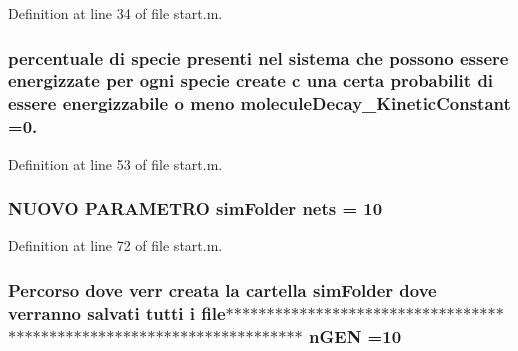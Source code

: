 Definition at line 34 of file start.\-m.

\hypertarget{a00065_a85569bbcfd8fbc0081b5a144eaf516f5}{
\subsubsection[{molecule\-Decay\-\_\-\-Kinetic\-Constant}]{\setlength{\rightskip}{0pt plus 5cm}percentuale di specie presenti nel sistema che possono essere energizzate per ogni specie create {\bf c} una certa probabilit di essere energizzabile o meno molecule\-Decay\-\_\-\-Kinetic\-Constant =0.}}\label{a00065_a85569bbcfd8fbc0081b5a144eaf516f5}


Definition at line 53 of file start.\-m.

\hypertarget{a00065_a006c95919fb4982bffba044f13cd2a7f}{
\subsubsection[{nets}]{\setlength{\rightskip}{0pt plus 5cm}N\-U\-O\-V\-O P\-A\-R\-A\-M\-E\-T\-R\-O {\bf sim\-Folder} nets = 10}}\label{a00065_a006c95919fb4982bffba044f13cd2a7f}


Definition at line 72 of file start.\-m.

\hypertarget{a00065_a4c8fe523edbe179c5d215da13f469f72}{
\subsubsection[{n\-G\-E\-N}]{\setlength{\rightskip}{0pt plus 5cm}Percorso dove verr creata la cartella {\bf sim\-Folder} dove verranno salvati tutti {\bf i} {\bf file}$\ast$$\ast$$\ast$$\ast$$\ast$$\ast$$\ast$$\ast$$\ast$$\ast$$\ast$$\ast$$\ast$$\ast$$\ast$$\ast$$\ast$$\ast$$\ast$$\ast$$\ast$$\ast$$\ast$$\ast$$\ast$$\ast$$\ast$$\ast$$\ast$$\ast$$\ast$$\ast$$\ast$$\ast$$\ast$$\ast$$\ast$$\ast$$\ast$$\ast$$\ast$$\ast$$\ast$$\ast$$\ast$$\ast$$\ast$$\ast$$\ast$$\ast$$\ast$$\ast$$\ast$$\ast$$\ast$$\ast$$\ast$$\ast$$\ast$$\ast$$\ast$$\ast$$\ast$$\ast$$\ast$$\ast$$\ast$$\ast$$\ast$$\ast$ n\-G\-E\-N =10}}\label{a00065_a4c8fe523edbe179c5d215da13f469f72}


